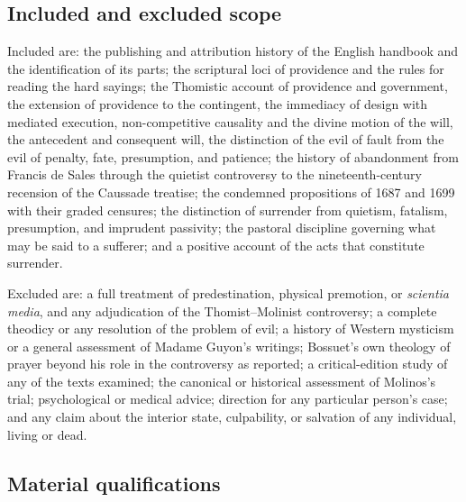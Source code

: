 \subsection{Included and excluded scope}

Included are: the publishing and attribution history of the English handbook and the identification of its parts; the scriptural loci of providence and the rules for reading the hard sayings; the Thomistic account of providence and government, the extension of providence to the contingent, the immediacy of design with mediated execution, non-competitive causality and the divine motion of the will, the antecedent and consequent will, the distinction of the evil of fault from the evil of penalty, fate, presumption, and patience; the history of abandonment from Francis de Sales through the quietist controversy to the nineteenth-century recension of the Caussade treatise; the condemned propositions of 1687 and 1699 with their graded censures; the distinction of surrender from quietism, fatalism, presumption, and imprudent passivity; the pastoral discipline governing what may be said to a sufferer; and a positive account of the acts that constitute surrender.

Excluded are: a full treatment of predestination, physical premotion, or \emph{scientia media}, and any adjudication of the Thomist--Molinist controversy; a complete theodicy or any resolution of the problem of evil; a history of Western mysticism or a general assessment of Madame Guyon's writings; Bossuet's own theology of prayer beyond his role in the controversy as reported; a critical-edition study of any of the texts examined; the canonical or historical assessment of Molinos's trial; psychological or medical advice; direction for any particular person's case; and any claim about the interior state, culpability, or salvation of any individual, living or dead.

\subsection{Material qualifications}


